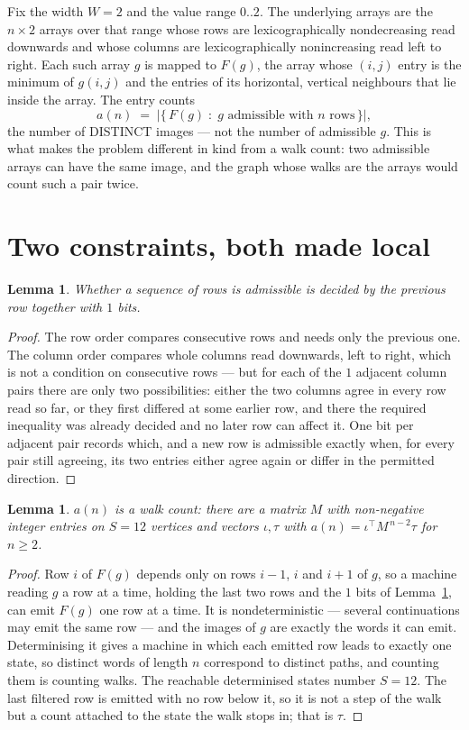 \documentclass[11pt,a4paper]{article}
\theoremstyle{plain}
\newtheorem{lemma}[theorem]{Lemma}
\theoremstyle{definition}
\begin{document}
Fix the width $W=2$ and the value range $0..2$. The underlying arrays are the
$n\times2$ arrays over that range whose rows are lexicographically nondecreasing read downwards
and whose columns are lexicographically nonincreasing read left to right. Each such array $g$
is mapped to $F(g)$, the array whose $(i,j)$ entry is the minimum of $g(i,j)$ and the entries
of its horizontal, vertical neighbours that lie inside the array. The entry counts
\[
a(n)\;=\;\bigl|\{\,F(g)\;:\;g\text{ admissible with }n\text{ rows}\,\}\bigr|,
\]
the number of DISTINCT images --- not the number of admissible $g$. This is what makes the
problem different in kind from a walk count: two admissible arrays can have the same image, and
the graph whose walks are the arrays would count such a pair twice.

\section{Two constraints, both made local}

\begin{lemma}\label{lem:local}
Whether a sequence of rows is admissible is decided by the previous row together with
$1$ bits.
\end{lemma}

\begin{proof}
The row order compares consecutive rows and needs only the previous one. The column order
compares whole columns read downwards, left to right, which is not a condition on consecutive
rows --- but for each of the $1$ adjacent column pairs there are only two possibilities:
either the two columns agree in every row read so far, or they first differed at some earlier
row, and there the required inequality was already decided and no later row can affect it. One
bit per adjacent pair records which, and a new row is admissible exactly when, for every pair
still agreeing, its two entries either agree again or differ in the permitted direction.
\end{proof}

\begin{lemma}\label{lem:det}
$a(n)$ is a walk count: there are a matrix $M$ with non-negative integer entries on $S=12$
vertices and vectors $\iota,\tau$ with $a(n)=\iota^{\!\top}M^{\,n-2}\tau$ for $n\ge2$.
\end{lemma}

\begin{proof}
Row $i$ of $F(g)$ depends only on rows $i-1$, $i$ and $i+1$ of $g$, so a machine reading $g$ a
row at a time, holding the last two rows and the $1$ bits of Lemma~\ref{lem:local}, can
emit $F(g)$ one row at a time. It is nondeterministic --- several continuations may emit the
same row --- and the images of $g$ are exactly the words it can emit. Determinising it gives a
machine in which each emitted row leads to exactly one state, so distinct words of length $n$
correspond to distinct paths, and counting them is counting walks. The reachable determinised
states number $S=12$. The last filtered row is emitted with no row below it, so it is not a
step of the walk but a count attached to the state the walk stops in; that is $\tau$.
\end{proof}
\end{document}
